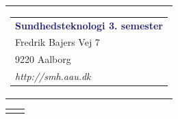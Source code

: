 


% 
\thispagestyle{empty}
\begin{nopagebreak}
{\samepage 

\begin{tabular}{r}
\parbox{\textwidth}{  
\hfill \hspace{2cm} \parbox{8cm}{\begin{tabular}{l} %
{\small \textbf{\textcolor{MidnightBlue}{Sundhedsteknologi 3. semester}}}\\ 
{\small \textcolor{NavyBlue}{Fredrik Bajers Vej 7}} \\
{\small \textcolor{NavyBlue}{9220 Aalborg}} \\
{\small \textcolor{NavyBlue}{\emph{http://smh.aau.dk}}}
\end{tabular}}}
\end{tabular}

\begin{tabular}{cc}
\parbox{7cm}{
\begin{description}


\end{description}}
\end{tabular}}
\end{nopagebreak}
